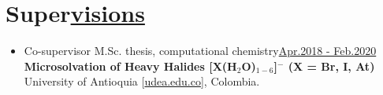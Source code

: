 \section{Super\href{.}{visions}}

\begin{itemize}
    \small

    \item Co-supervisor M.Sc. thesis, computational chemistry\hfill \href{.}{Apr.2018 - Feb.2020}\\
          \textbf{Microsolvation of Heavy Halides [X(H$_2$O)$_{1-6}$]$^-$ (X = Br, I, At)}\\
          University of Antioquia [\href{www.udea.edu.co}{udea.edu.co}],
          Colombia.



\end{itemize}


